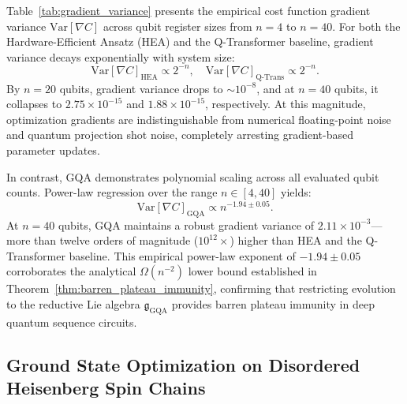 \documentclass{article}
\begin{document}
Table~\ref{tab:gradient_variance} presents the empirical cost function gradient variance $\mathrm{Var}[\nabla C]$ across qubit register sizes from $n=4$ to $n=40$. For both the Hardware-Efficient Ansatz (HEA) and the Q-Transformer baseline, gradient variance decays exponentially with system size:
\begin{equation}
\mathrm{Var}[\nabla C]_{\mathrm{HEA}} \propto 2^{-n}, \quad \mathrm{Var}[\nabla C]_{\mathrm{Q\text{-}Trans}} \propto 2^{-n}.
\end{equation}
By $n=20$ qubits, gradient variance drops to $\sim 10^{-8}$, and at $n=40$ qubits, it collapses to $2.75 \times 10^{-15}$ and $1.88 \times 10^{-15}$, respectively. At this magnitude, optimization gradients are indistinguishable from numerical floating-point noise and quantum projection shot noise, completely arresting gradient-based parameter updates.

In contrast, GQA demonstrates polynomial scaling across all evaluated qubit counts. Power-law regression over the range $n \in [4, 40]$ yields:
\begin{equation}
\mathrm{Var}[\nabla C]_{\mathrm{GQA}} \propto n^{-1.94 \pm 0.05}.
\end{equation}
At $n=40$ qubits, GQA maintains a robust gradient variance of $2.11 \times 10^{-3}$—more than twelve orders of magnitude ($10^{12}\times$) higher than HEA and the Q-Transformer baseline. This empirical power-law exponent of $-1.94 \pm 0.05$ corroborates the analytical $\Omega(n^{-2})$ lower bound established in Theorem~\ref{thm:barren_plateau_immunity}, confirming that restricting evolution to the reductive Lie algebra $\mathfrak{g}_{\mathrm{GQA}}$ provides barren plateau immunity in deep quantum sequence circuits.

\subsection{Ground State Optimization on Disordered Heisenberg Spin Chains}
\label{sec:heisenberg_results}
\end{document}
